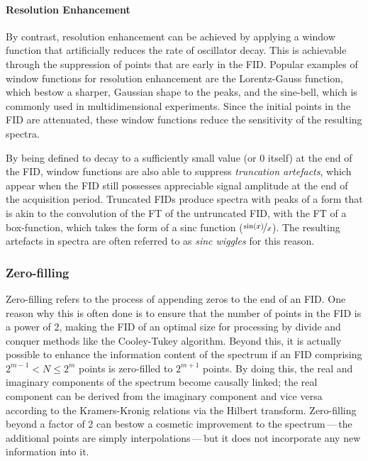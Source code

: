 \paragraph{Resolution Enhancement} By contrast, resolution enhancement can be
achieved by applying a window function that artificially reduces the rate of
oscillator decay. This is achievable through the suppression of points that are
early in the \ac{FID}. Popular
examples of window functions for resolution enhancement are the Lorentz-Gauss
function, which bestow a sharper, Gaussian shape to the peaks, and the
sine-bell, which is commonly used in multidimensional experiments. Since the
initial points in the \ac{FID} are attenuated, these window functions reduce the
sensitivity of the resulting spectra.

By being defined to decay to a sufficiently small value (or $0$ itself) at the
end of
the \ac{FID}, window functions are also able to suppress \emph{truncation
artefacts}, which appear when the \ac{FID} still possesses appreciable signal
amplitude at the end of the acquisition period. Truncated \acp{FID} produce
spectra with peaks of a form that is akin to the convolution of the \ac{FT} of
the untruncated \ac{FID}, with the \ac{FT} of a box-function, which takes the
form of a sinc function ($\nicefrac{\sin(x)}{x}$). The resulting artefacts in
spectra are often referred to as \emph{sinc wiggles} for this reason.

\subsubsection{Zero-filling}
Zero-filling refers to the process of appending zeros to the end of an
\ac{FID}. One reason why this is often done is to ensure that the number of
points in the \ac{FID} is a power of 2, making the \ac{FID} of an optimal size
for processing by divide and conquer methods like the Cooley-Tukey
algorithm\cite{Cooley1965}. Beyond this, it is actually
possible to enhance the information content of the spectrum if an \ac{FID}
comprising $2^{m-1} < N \leq 2^m$ points is zero-filled to $2^{m+1}$
points\cite{Bartholdi1973}. By doing this, the real and imaginary components of
the spectrum become causally linked; the real component can be derived from the
imaginary component and vice versa according to the Kramers-Kronig relations
via the Hilbert transform.
Zero-filling beyond a factor of 2 can bestow a
cosmetic improvement to the spectrum\,---\,the additional points are simply
interpolations\,---\,but it does not incorporate any new information into it.


